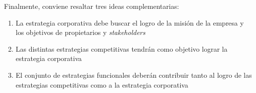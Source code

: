 \documentclass[10pt,a4paper,spanish]{report}
\begin{document}
                  Finalmente, conviene resaltar tres ideas complementarias:
                  \begin{enumerate}[1.]
                        \item La estrategia corporativa debe buscar el logro de la misión de la empresa y los objetivos de propietarios y \textit{\textcolor[rgb]{0.4,0.9,0.6}{stakeholders}}
                        \item Las distintas estrategias competitivas tendrán como objetivo lograr la estrategia corporativa
                        \item El conjunto de estrategias funcionales deberán contribuir tanto al logro de las estrategias competitivas como a la estrategia corporativa
                  \end{enumerate}
\end{document}
